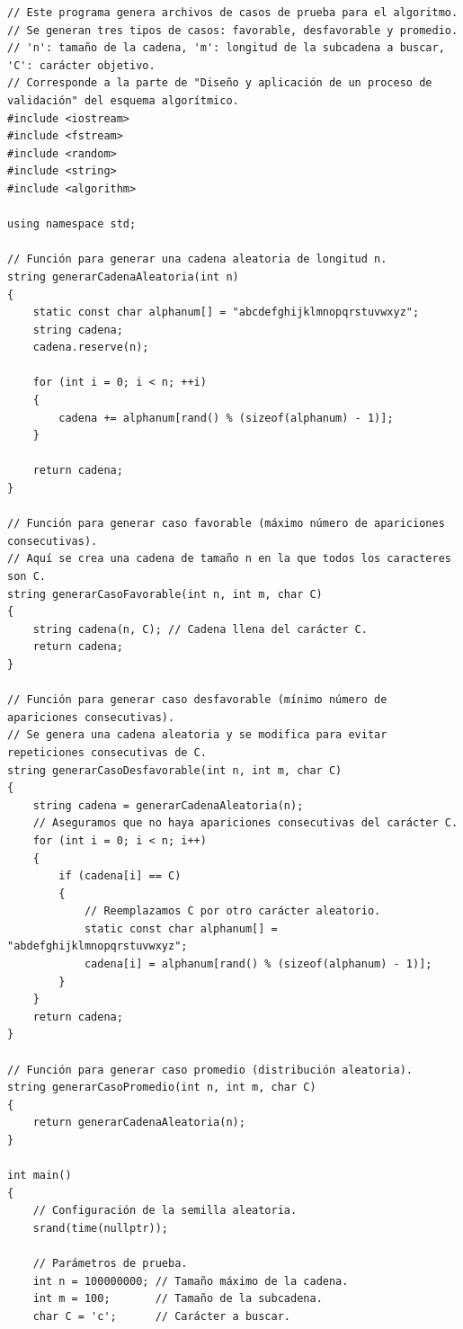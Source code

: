 \documentclass[12pt,a4paper]{article}
\begin{document}
\begin{lstlisting}[caption=Generador de Casos de Prueba, label=lst:generador]
// Este programa genera archivos de casos de prueba para el algoritmo.
// Se generan tres tipos de casos: favorable, desfavorable y promedio.
// 'n': tamaño de la cadena, 'm': longitud de la subcadena a buscar, 'C': carácter objetivo.
// Corresponde a la parte de "Diseño y aplicación de un proceso de validación" del esquema algorítmico.
#include <iostream>
#include <fstream>
#include <random>
#include <string>
#include <algorithm>

using namespace std;

// Función para generar una cadena aleatoria de longitud n.
string generarCadenaAleatoria(int n)
{
    static const char alphanum[] = "abcdefghijklmnopqrstuvwxyz";
    string cadena;
    cadena.reserve(n);

    for (int i = 0; i < n; ++i)
    {
        cadena += alphanum[rand() % (sizeof(alphanum) - 1)];
    }

    return cadena;
}

// Función para generar caso favorable (máximo número de apariciones consecutivas).
// Aquí se crea una cadena de tamaño n en la que todos los caracteres son C.
string generarCasoFavorable(int n, int m, char C)
{
    string cadena(n, C); // Cadena llena del carácter C.
    return cadena;
}

// Función para generar caso desfavorable (mínimo número de apariciones consecutivas).
// Se genera una cadena aleatoria y se modifica para evitar repeticiones consecutivas de C.
string generarCasoDesfavorable(int n, int m, char C)
{
    string cadena = generarCadenaAleatoria(n);
    // Aseguramos que no haya apariciones consecutivas del carácter C.
    for (int i = 0; i < n; i++)
    {
        if (cadena[i] == C)
        {
            // Reemplazamos C por otro carácter aleatorio.
            static const char alphanum[] = "abdefghijklmnopqrstuvwxyz";
            cadena[i] = alphanum[rand() % (sizeof(alphanum) - 1)];
        }
    }
    return cadena;
}

// Función para generar caso promedio (distribución aleatoria).
string generarCasoPromedio(int n, int m, char C)
{
    return generarCadenaAleatoria(n);
}

int main()
{
    // Configuración de la semilla aleatoria.
    srand(time(nullptr));

    // Parámetros de prueba.
    int n = 100000000; // Tamaño máximo de la cadena.
    int m = 100;       // Tamaño de la subcadena.
    char C = 'c';      // Carácter a buscar.


\end{lstlisting}
\end{document}

